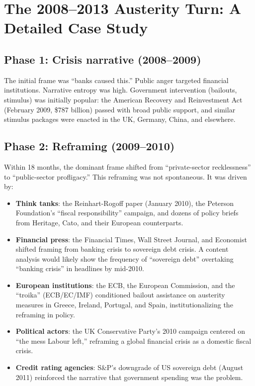 \section{The 2008--2013 Austerity Turn: A Detailed Case Study}
\label{sec:ch25-case}

\subsection{Phase 1: Crisis narrative (2008--2009)}

The initial frame was ``banks caused this.''
Public anger targeted financial institutions.
Narrative entropy was high.
Government intervention (bailouts, stimulus) was initially popular: the American Recovery and Reinvestment Act (February 2009, \$787 billion) passed with broad public support, and similar stimulus packages were enacted in the UK, Germany, China, and elsewhere.

\subsection{Phase 2: Reframing (2009--2010)}

Within 18 months, the dominant frame shifted from ``private-sector recklessness'' to ``public-sector profligacy.''
This reframing was not spontaneous.
It was driven by:
\begin{itemize}[nosep]
  \item \textbf{Think tanks}: the Reinhart-Rogoff paper (January 2010), the Peterson Foundation's ``fiscal responsibility'' campaign, and dozens of policy briefs from Heritage, Cato, and their European counterparts.
  \item \textbf{Financial press}: the Financial Times, Wall Street Journal, and Economist shifted framing from banking crisis to sovereign debt crisis.
  A content analysis would likely show the frequency of ``sovereign debt'' overtaking ``banking crisis'' in headlines by mid-2010.
  \item \textbf{European institutions}: the ECB, the European Commission, and the ``troika'' (ECB/EC/IMF) conditioned bailout assistance on austerity measures in Greece, Ireland, Portugal, and Spain, institutionalizing the reframing in policy.
  \item \textbf{Political actors}: the UK Conservative Party's 2010 campaign centered on ``the mess Labour left,'' reframing a global financial crisis as a domestic fiscal crisis.
  \item \textbf{Credit rating agencies}: S\&P's downgrade of US sovereign debt (August 2011) reinforced the narrative that government spending was the problem.
\end{itemize}

